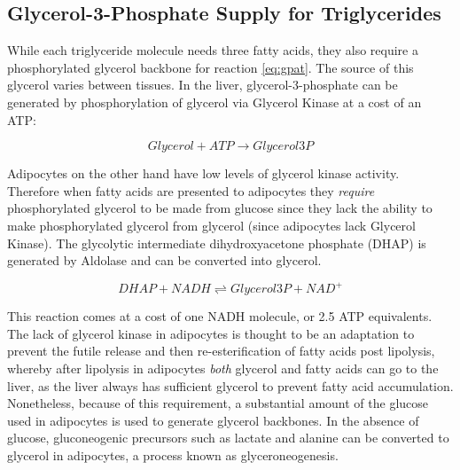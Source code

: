 \documentclass{tufte-handout}
\begin{document}
\subsection{Glycerol-3-Phosphate Supply for Triglycerides}

While each triglyceride molecule needs three fatty acids, they also require a phosphorylated glycerol backbone for reaction \ref{eq:gpat}.  The source of this glycerol varies between tissues.  In the liver, glycerol-3-phosphate can be generated by phosphorylation of glycerol via Glycerol Kinase at a cost of an ATP:

\begin{equation}
Glycerol + ATP \rightarrow Glycerol3P
\end{equation}


Adipocytes on the other hand have low levels of glycerol kinase activity.  Therefore when fatty acids are presented to adipocytes they \emph{require} phosphorylated glycerol to be made from glucose since they lack the ability to make phosphorylated glycerol from glycerol (since adipocytes lack Glycerol Kinase).  The glycolytic intermediate dihydroxyacetone phosphate (DHAP) is generated by Aldolase and can be converted into glycerol.

\begin{equation}\label{eq:g3pdh}
DHAP + NADH \rightleftharpoons Glycerol3P + NAD^+
\end{equation}


This reaction comes at a cost of one NADH molecule, or 2.5 ATP equivalents. The lack of glycerol kinase in adipocytes is thought to be an adaptation to prevent the futile release and then re-esterification of fatty acids post lipolysis, whereby after lipolysis in adipocytes \emph{both} glycerol and fatty acids can go to the liver, as the liver always has sufficient glycerol to prevent fatty acid accumulation. Nonetheless, because of this requirement, a substantial amount of the glucose used in adipocytes is used to generate glycerol backbones. In the absence of glucose, gluconeogenic precursors such as lactate and alanine can be converted to glycerol in adipocytes, a process known as glyceroneogenesis.
\end{document}
